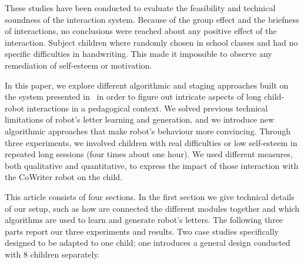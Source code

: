 \documentclass{sig-alternate}
\begin{document}
These studies have been conducted to evaluate the feasibility and technical soundness
of the interaction system. Because of the group effect and the briefness of
interactions, no conclusions were reached about any positive effect of the
interaction. Subject children where randomly chosen in school
classes and had no specific difficulties in handwriting. This made it
impossible to observe any remediation of self-esteem or motivation.

In this paper, we explore different algorithmic and staging approaches built on the system presented in~\cite{hood2015when} in order to figure out intricate aspects of long child-robot interactions in a pedagogical context. We solved previous 
technical limitations of robot's letter learning and generation, and we introduce new algorithmic approaches that make robot's behaviour more convincing.
Through three experiments, we involved children with real difficulties or low 
self-esteem in repeated long sessions (four times about one hour). We used different
measures, both qualitative and quantitative, to express the impact of those
interaction with the CoWriter robot on the child.

This article consists of four sections. In the first section we give technical details of our setup, such as how are connected the different modules
together and which algorithms are used to learn and generate robot's letters.
The following three parts report our three experiments and results. Two case studies specifically designed to be adapted to one child; one introduces a general design conducted with 8 children separately. 


%
\end{document}
